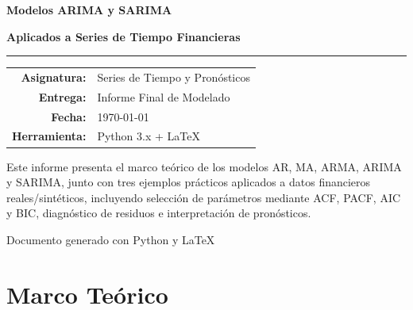 \documentclass[12pt, a4paper]{article}
\begin{document}

\begin{titlepage}
  \centering
  \vspace*{1.5cm}

  {\Huge\bfseries\color{azulTec} Modelos ARIMA y SARIMA\\[0.4em]}
  {\LARGE\bfseries Aplicados a Series de Tiempo Financieras\par}

  \vspace{1.2cm}
  \textcolor{azulTec}{\rule{0.7\linewidth}{1.5pt}}
  \vspace{1cm}

  {\large
    \begin{tabular}{rl}
      \textbf{Asignatura:}  & Series de Tiempo y Pronósticos \\[4pt]
      \textbf{Entrega:}     & Informe Final de Modelado       \\[4pt]
      \textbf{Fecha:}       & \today                          \\[4pt]
      \textbf{Herramienta:} & Python 3.x + LaTeX              \\
    \end{tabular}
  }

  \vspace{1.5cm}

  \begin{defbox}
    \centering\small
    Este informe presenta el marco teórico de los modelos AR, MA, ARMA, ARIMA y SARIMA,
    junto con tres ejemplos prácticos aplicados a datos financieros reales/sintéticos,
    incluyendo selección de parámetros mediante ACF, PACF, AIC y BIC,
    diagnóstico de residuos e interpretación de pronósticos.
  \end{defbox}

  \vfill
  {\small\textcolor{grisOscuro}{Documento generado con Python y \LaTeX}}
\end{titlepage}

\tableofcontents
\newpage

\section{Marco Teórico}
\end{document}
